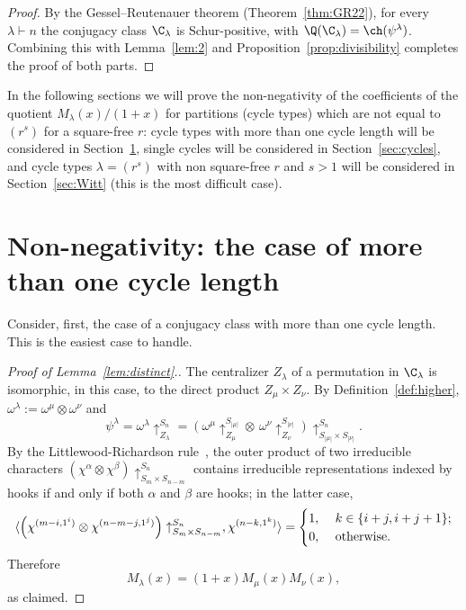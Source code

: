 \begin{proof}
    By the Gessel--Reutenauer theorem (Theorem~\ref{thm:GR22}), for every $\lambda\vdash n$ the conjugacy class $\C_\lambda$ 
    is Schur-positive, with $\Q(\C_\lambda) = \ch(\psi^\lambda)$.
    Combining this with Lemma~\ref{lem:2}  and  Proposition~\ref{prop:divisibility} completes the proof of both parts.
\end{proof}

In the following sections we will prove the non-negativity of the coefficients of the quotient $M_\lambda(x)/(1+x)$ for partitions (cycle types) which are not equal to $(r^s)$ for a square-free $r$: 
cycle types with more than one cycle length will be considered in Section~\ref{sec:distinct}, 
single cycles will be considered in Section~\ref{sec:cycles},
and cycle types $\lambda = (r^s)$ with non square-free $r$ and $s>1$ will be considered in Section~\ref{sec:Witt} (this is the most difficult case).


\section{Non-negativity: the case of more than one cycle length}
\label{sec:distinct}

Consider, first, the case of a conjugacy class with more than one cycle length. This is the easiest case to handle.

\begin{proof}[Proof of Lemma~\ref{lem:distinct}.]
    The centralizer $Z_\lambda$ of a permutation in $\C_\lambda$ is isomorphic, in this case, to the direct product $Z_\mu \times Z_\nu$. 
    By Definition~\ref{def:higher}, 
    $\omega^\lambda := \omega^{\mu} \otimes \omega^\nu$ and  
    \begin{equation}\label{eq:distinct}
        \psi^\lambda 
        = \omega^\lambda\uparrow_{Z_\lambda}^{S_n}
        = \left(\omega^{\mu}\uparrow_{Z_{\mu}}^{S_{|\mu|}} \otimes \, 
		\omega^{\nu}\uparrow_{Z_{\nu}}^{S_{|\nu|}}\right)
		\uparrow_{S_{|\mu|}\times S_{|\nu|}}^{S_n}.		    
    \end{equation}
    By the Littlewood-Richardson rule~\cite[Theorem A1.3.3]{EC2}, the outer product  of two irreducible characters 
    $\left( \chi^\alpha\otimes\chi^\beta\right)\uparrow_{S_m\times S_{n-m}}^{S_n}$ 
    contains irreducible representations indexed by hooks if and only if both $\alpha$ and $\beta$ are hooks; in the latter case,
    \[
        \langle \left( \chi^{(m-i,1^i)} \otimes \chi^{(n-m-j,1^j)}\right)\uparrow_{S_m \times S_{n-m}}^{S_n}, \chi^{(n-k,1^k)}\rangle = 
        \begin{cases}
            1, & \ k\in \{i+j, i+j+1\};\\
            0, & \ \rm{otherwise.}
        \end{cases}
    \]
    Therefore
    \[
        M_\lambda(x) = (1+x) M_\mu(x) M_\nu(x),
    \]
    as claimed.
\end{proof}	

